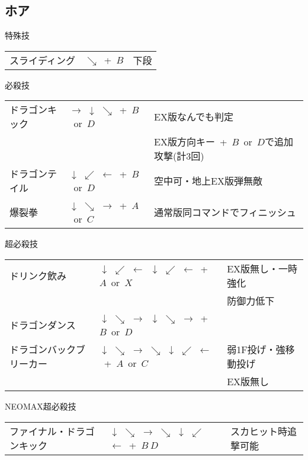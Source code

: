 \documentclass[a4j,11pt]{jarticle}
\def\hado{$\downarrow$ $\searrow$ $\rightarrow$}%
\def\tatsu{$\downarrow$ $\swarrow$ $\leftarrow$}%
\def\syoryu{$\rightarrow$ $\downarrow$ $\searrow$}%
\def\ryuko{$\downarrow$ $\searrow$ $\rightarrow$ $\searrow$ $\downarrow$ $\swarrow$ $\leftarrow$}%
\begin{document}
\subsection{ホア}
\begin{itembox}[l]{特殊技}
\begin{tabular}{lll}
スライディング&$\searrow$\ +\ $B$&下段%
\end{tabular}
\end{itembox}
\begin{itembox}[l]{必殺技}
\begin{tabular}{lll}
ドラゴンキック&\syoryu\ +\ $B$\ or\ $D$&EX版なんでも判定\\%
&&EX版方向キー\ +\ $B$\ or\ $D$で追加攻撃(計3回)\\
ドラゴンテイル&\tatsu\ +\ $B$\ or\ $D$&空中可・地上EX版弾無敵\\%
爆裂拳&\hado\ +\ $A$\ or\ $C$&通常版同コマンドでフィニッシュ\\%
\end{tabular}
\end{itembox}
\begin{itembox}[l]{超必殺技}
\begin{tabular}{lll}
ドリンク飲み&\tatsu\ \tatsu\ +\ $A$\ or\ $X$&EX版無し・一時強化\\
&&防御力低下\\%
ドラゴンダンス&\hado\ \hado\ +\ $B$\ or\ $D$&\\%
ドラゴンバックブリーカー&\ryuko\ +\ $A$\ or\ $C$&弱1F投げ・強移動投げ\\%
&&EX版無し
\end{tabular}
\end{itembox}
\begin{itembox}[l]{NEOMAX超必殺技}
\begin{tabular}{lll}
ファイナル・ドラゴンキック&\ryuko\ +\ $B\ D$&スカヒット時追撃可能%
\end{tabular}
\end{itembox}
\newpage
\end{document}
